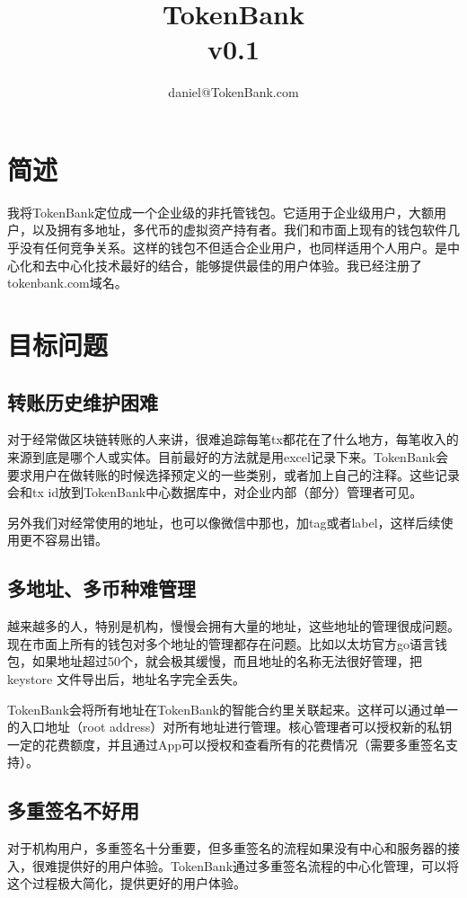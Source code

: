 \documentclass[UTF8,nofonts]{ctexart}
\title{\textbf{TokenBank}\\v0.1}
\author{
    daniel@TokenBank.com
}
\begin{document}
\maketitle

\section{简述\label{sec:idea}}

我将TokenBank定位成一个企业级的非托管钱包。它适用于企业级用户，大额用户，以及拥有多地址，多代币的虚拟资产持有者。我们和市面上现有的钱包软件几乎没有任何竞争关系。这样的钱包不但适合企业用户，也同样适用个人用户。是中心化和去中心化技术最好的结合，能够提供最佳的用户体验。我已经注册了tokenbank.com域名。

\section{目标问题\label{sec:idea}}

\subsection{转账历史维护困难}
对于经常做区块链转账的人来讲，很难追踪每笔tx都花在了什么地方，每笔收入的来源到底是哪个人或实体。目前最好的方法就是用excel记录下来。TokenBank会要求用户在做转账的时候选择预定义的一些类别，或者加上自己的注释。这些记录会和tx id放到TokenBank中心数据库中，对企业内部（部分）管理者可见。

另外我们对经常使用的地址，也可以像微信中那也，加tag或者label，这样后续使用更不容易出错。

\subsection{多地址、多币种难管理}

越来越多的人，特别是机构，慢慢会拥有大量的地址，这些地址的管理很成问题。现在市面上所有的钱包对多个地址的管理都存在问题。比如以太坊官方go语言钱包，如果地址超过50个，就会极其缓慢，而且地址的名称无法很好管理，把keystore 文件导出后，地址名字完全丢失。

TokenBank会将所有地址在TokenBank的智能合约里关联起来。这样可以通过单一的入口地址（root address）对所有地址进行管理。核心管理者可以授权新的私钥一定的花费额度，并且通过App可以授权和查看所有的花费情况（需要多重签名支持）。

\subsection{多重签名不好用}
对于机构用户，多重签名十分重要，但多重签名的流程如果没有中心和服务器的接入，很难提供好的用户体验。TokenBank通过多重签名流程的中心化管理，可以将这个过程极大简化，提供更好的用户体验。
\end{document}
